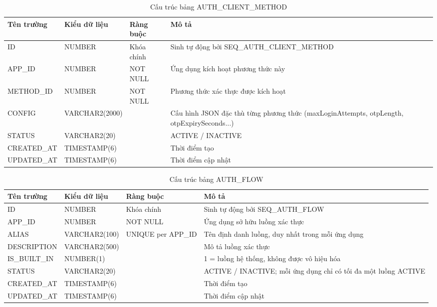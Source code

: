 \documentclass[../DoAn.tex]{subfiles}
\begin{document}
\begin{table}[H]
\centering
\caption{Cấu trúc bảng AUTH\_CLIENT\_METHOD}
\label{tab:auth-client-method}
\footnotesize
\begin{tabular}{|p{3.0cm}|p{2.3cm}|p{2.7cm}|p{4.5cm}|}
\hline
\textbf{Tên trường} & \textbf{Kiểu dữ liệu} & \textbf{Ràng buộc} & \textbf{Mô tả} \\ \hline
ID & NUMBER & Khóa chính & Sinh tự động bởi SEQ\_AUTH\_CLIENT\_METHOD \\ \hline
APP\_ID & NUMBER & NOT NULL & Ứng dụng kích hoạt phương thức này \\ \hline
METHOD\_ID & NUMBER & NOT NULL & Phương thức xác thực được kích hoạt \\ \hline
CONFIG & VARCHAR2(2000) & & Cấu hình JSON đặc thù từng phương thức (maxLoginAttempts, otpLength, otpExpirySeconds...) \\ \hline
STATUS & VARCHAR2(20) & & ACTIVE / INACTIVE \\ \hline
CREATED\_AT & TIMESTAMP(6) & & Thời điểm tạo \\ \hline
UPDATED\_AT & TIMESTAMP(6) & & Thời điểm cập nhật \\ \hline
\end{tabular}
\end{table}

\begin{table}[H]
\centering
\caption{Cấu trúc bảng AUTH\_FLOW}
\label{tab:auth-flow}
\footnotesize
\begin{tabular}{|p{3.0cm}|p{2.3cm}|p{2.7cm}|p{4.5cm}|}
\hline
\textbf{Tên trường} & \textbf{Kiểu dữ liệu} & \textbf{Ràng buộc} & \textbf{Mô tả} \\ \hline
ID & NUMBER & Khóa chính & Sinh tự động bởi SEQ\_AUTH\_FLOW \\ \hline
APP\_ID & NUMBER & NOT NULL & Ứng dụng sở hữu luồng xác thực \\ \hline
ALIAS & VARCHAR2(100) & UNIQUE per APP\_ID & Tên định danh luồng, duy nhất trong mỗi ứng dụng \\ \hline
DESCRIPTION & VARCHAR2(500) & & Mô tả luồng xác thực \\ \hline
IS\_BUILT\_IN & NUMBER(1) & & 1 = luồng hệ thống, không được vô hiệu hóa \\ \hline
STATUS & VARCHAR2(20) & & ACTIVE / INACTIVE; mỗi ứng dụng chỉ có tối đa một luồng ACTIVE \\ \hline
CREATED\_AT & TIMESTAMP(6) & & Thời điểm tạo \\ \hline
UPDATED\_AT & TIMESTAMP(6) & & Thời điểm cập nhật \\ \hline
\end{tabular}
\end{table}
\end{document}
